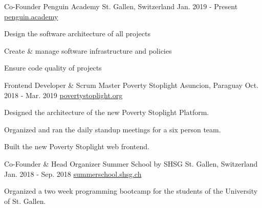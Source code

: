 

\begin{cventries}
  \cventry
    {Co-Founder} %
    {Penguin Academy} %
    {St. Gallen, Switzerland} %
    {Jan. 2019 - Present} %
    {\href{https://penguin.academy}{penguin.academy}} %
    {
      \begin{cvitems} %
      \item {Design the software architecture of all projects}
      \item {Create \& manage software infrastructure and policies}
      \item {Ensure code quality of projects}
      \end{cvitems}
    }
  \cventry
    {Frontend Developer \& Scrum Master} %
    {Poverty Stoplight} %
    {Asuncion, Paraguay} %
    {Oct. 2018 - Mar. 2019} %
    {\href{https://povertystoplight.org}{povertystoplight.org}} %
    {
      \begin{cvitems} %
      \item {Designed the architecture of the new Poverty Stoplight Platform.}
      \item {Organized and ran the daily standup meetings for a six person team.}
      \item {Built the new Poverty Stoplight web frontend.}
      \end{cvitems}
    }
  \cventry
    {Co-Founder \& Head Organizer} %
    {Summer School by SHSG} %
    {St. Gallen, Switzerland} %
    {Jan. 2018 - Sep. 2018} %
    {\href{https://summerschool.shsg.ch}{summerschool.shsg.ch}} %
    {
      \begin{cvitems} %
      \item {Organized a two week programming bootcamp for the students of the University of St. Gallen.}

\end{cvitems}}
\end{cventries}
